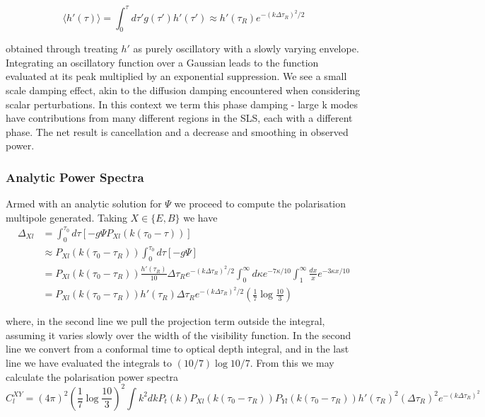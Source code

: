 \documentclass[a4paper,10pt]{article}
\begin{document}
\begin{equation}
\langle h'(\tau) \rangle = \int_0^{\tau} d\tau' g(\tau')h'(\tau') \approx h'(\tau_R)e^{-(k\Delta\tau_R)^2/2}
\end{equation}

obtained through treating $h'$ as purely oscillatory with a slowly varying envelope. Integrating an oscillatory function over a Gaussian leads to the function evaluated at its peak multiplied by an exponential suppression. We see a small scale damping effect, akin to the diffusion damping encountered when considering scalar perturbations. In this context we term this phase damping - large k modes have contributions from many different regions in the SLS, each with a different phase. The net result is cancellation and a decrease and smoothing in observed power.\\

\subsubsection{Analytic Power Spectra}

Armed with an analytic solution for $\Psi$ we proceed to compute the polarisation multipole generated. Taking $X\in\{E,B\}$ we have
\begin{equation}
\begin{split}
\Delta_{Xl} &= \int_0^{\tau_0} d\tau [-g\Psi P_{Xl}(k(\tau_0-\tau))]\\
&\approx P_{Xl}(k(\tau_0-\tau_R)) \int_0^{\tau_0} d\tau [-g\Psi] \\
&= P_{Xl}(k(\tau_0-\tau_R)) \frac{h'(\tau_R)}{10}\Delta\tau_Re^{-(k\Delta\tau_R)^2/2} \int_0^\infty d\kappa e^{-7\kappa/10} \int_1^\infty\frac{dx}{x}e^{-3\kappa x/10}\\
&=P_{Xl}(k(\tau_0-\tau_R)) h'(\tau_R)\Delta\tau_Re^{-(k\Delta\tau_R)^2/2} (\frac{1}{7}\log{\frac{10}{3}})
\end{split}
\end{equation}

where, in the second line we pull the projection term outside the integral, assuming it varies slowly over the width of the visibility function. In the second line we convert from a conformal time to optical depth integral, and in the last line we have evaluated the integrals to $(10/7)\log{10/7}$. From this we may calculate the polarisation power spectra
\begin{equation}
C_l^{XY} = (4\pi)^2 (\frac{1}{7}\log{\frac{10}{3}})^2 \int k^2dk P_t(k) P_{Xl}(k(\tau_0-\tau_R))P_{Yl}(k(\tau_0-\tau_R))h'(\tau_R)^2(\Delta\tau_R)^2e^{-(k\Delta\tau_R)^2}
\end{equation}
\end{document}
